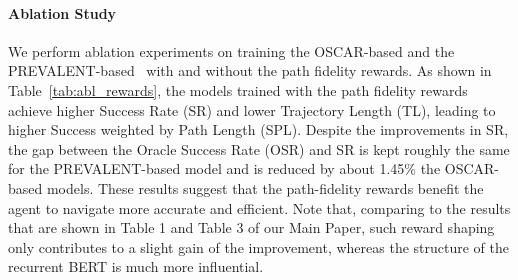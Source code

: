 \documentclass[final]{cvpr}
\begin{document}
\paragraph{Ablation Study}

We perform ablation experiments on training the OSCAR-based and the PREVALENT-based \vlnbert~with and without the path fidelity rewards. As shown in Table~\ref{tab:abl_rewards}, the models trained with the path fidelity rewards achieve higher Success Rate (SR) and lower Trajectory Length (TL), leading to higher Success weighted by Path Length (SPL). Despite the improvements in SR, the gap between the Oracle Success Rate (OSR) and SR is kept roughly the same for the PREVALENT-based model and is reduced by about 1.45\% the OSCAR-based models. These results suggest that the path-fidelity rewards benefit the agent to navigate more accurate and efficient. Note that, comparing to the results that are shown in Table 1 and Table 3 of our Main Paper, such reward shaping only contributes to a slight gain of the improvement, whereas the structure of the recurrent BERT is much more influential.

\begin{table}[htb!]
    \begin{center}
    \end{center}
    \caption{Performance of OSCAR-based and PREVALENT-based \vlnbert~trained with and without the path fidelity rewards.}
    \label{tab:abl_rewards}
\end{table}
\end{document}
